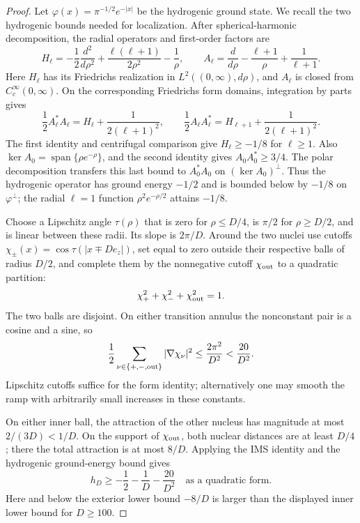 \begin{proof}
Let \(\varphi(x)=\pi^{-1/2}e^{-|x|}\) be the hydrogenic ground state.
We recall the two hydrogenic bounds needed for localization.  After
spherical-harmonic decomposition, the radial operators and first-order
factors are
\[
 H_\ell=-\frac12\frac{d^2}{d\rho^2}
       +\frac{\ell(\ell+1)}{2\rho^2}-\frac1\rho,
 \qquad
 A_\ell=\frac d{d\rho}-\frac{\ell+1}{\rho}+\frac1{\ell+1}.
\]
Here \(H_\ell\) has its Friedrichs realization in
\(L^2((0,\infty),d\rho)\), and \(A_\ell\) is closed from
\(C_c^\infty(0,\infty)\).
On the corresponding Friedrichs form domains, integration by parts gives
\[
 \frac12A_\ell^*A_\ell=H_\ell+\frac1{2(\ell+1)^2},
 \qquad
 \frac12A_\ell A_\ell^*=H_{\ell+1}+\frac1{2(\ell+1)^2}.
\]
The first identity and centrifugal comparison give
\(H_\ell\ge-1/8\) for \(\ell\ge1\).  Also
\(\ker A_0=\operatorname{span}\{\rho e^{-\rho}\}\), and the second
identity gives \(A_0A_0^*\ge3/4\).  The polar decomposition transfers
this last bound to \(A_0^*A_0\) on \((\ker A_0)^\perp\).
Thus the hydrogenic operator has ground energy \(-1/2\) and is
bounded below by \(-1/8\) on \(\varphi^\perp\); the radial
\(\ell=1\) function \(\rho^2e^{-\rho/2}\) attains \(-1/8\).

Choose a Lipschitz angle \(\tau(\rho)\) that is zero for
\(\rho\le D/4\), is \(\pi/2\) for \(\rho\ge D/2\), and is linear
between these radii.  Its slope is \(2\pi/D\).  Around the two nuclei
use cutoffs
\(\chi_\pm(x)=\cos\tau(|x\mp De_z|)\), set equal to zero outside their
respective balls of radius \(D/2\), and complete them by the
nonnegative cutoff \(\chi_{\rm out}\) to a quadratic partition:
\[
 \chi_+^2+\chi_-^2+\chi_{\rm out}^2=1.
\]
The two balls are disjoint.  On either transition annulus the
nonconstant pair is a cosine and a sine, so
\begin{equation}
 \frac12\sum_{\nu\in\{+,-,{\rm out}\}}|\nabla\chi_\nu|^2
 \le \frac{2\pi^2}{D^2}<\frac{20}{D^2}.
 \label{eq:two-centre-ims-cost}
\end{equation}
Lipschitz cutoffs suffice for the form identity; alternatively one may
smooth the ramp with arbitrarily small increases in these constants.

On either inner ball, the attraction of the other nucleus has
magnitude at most \(2/(3D)<1/D\).  On the support of
\(\chi_{\rm out}\), both nuclear distances are at least \(D/4\);
there the total attraction is at most \(8/D\).  Applying the IMS
identity and the hydrogenic ground-energy bound gives
\begin{equation}
 h_D\ge-\frac12-\frac1D-\frac{20}{D^2}
 \quad\text{as a quadratic form}.
 \label{eq:two-centre-bottom-lower}
\end{equation}
Here and below the exterior lower bound \(-8/D\) is larger than the
displayed inner lower bound for \(D\ge100\).


\end{proof}
